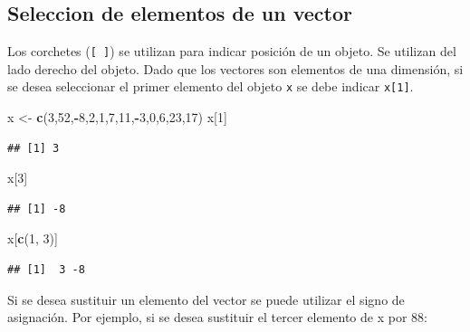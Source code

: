\documentclass[]{book}
\newenvironment{Shaded}{\begin{snugshade}}{\end{snugshade}}
\newcommand{\KeywordTok}[1]{\textcolor[rgb]{0.13,0.29,0.53}{\textbf{#1}}}
\newcommand{\DecValTok}[1]{\textcolor[rgb]{0.00,0.00,0.81}{#1}}
\newcommand{\StringTok}[1]{\textcolor[rgb]{0.31,0.60,0.02}{#1}}
\newcommand{\OperatorTok}[1]{\textcolor[rgb]{0.81,0.36,0.00}{\textbf{#1}}}
\newcommand{\NormalTok}[1]{#1}
\begin{document}
\hypertarget{seleccion-de-elementos-de-un-vector}{%
\subsection{Seleccion de elementos de un
vector}\label{seleccion-de-elementos-de-un-vector}}

Los corchetes (\texttt{{[}\ {]}}) se utilizan para indicar posición de
un objeto. Se utilizan del lado derecho del objeto. Dado que los
vectores son elementos de una dimensión, si se desea seleccionar el
primer elemento del objeto \texttt{x} se debe indicar \texttt{x{[}1{]}}.

\begin{Shaded}
\begin{Highlighting}[]
\NormalTok{x <-}\StringTok{ }\KeywordTok{c}\NormalTok{(}\DecValTok{3}\NormalTok{,}\DecValTok{52}\NormalTok{,}\OperatorTok{-}\DecValTok{8}\NormalTok{,}\DecValTok{2}\NormalTok{,}\DecValTok{1}\NormalTok{,}\DecValTok{7}\NormalTok{,}\DecValTok{11}\NormalTok{,}\OperatorTok{-}\DecValTok{3}\NormalTok{,}\DecValTok{0}\NormalTok{,}\DecValTok{6}\NormalTok{,}\DecValTok{23}\NormalTok{,}\DecValTok{17}\NormalTok{)}
\NormalTok{x[}\DecValTok{1}\NormalTok{]}
\end{Highlighting}
\end{Shaded}

\begin{verbatim}
## [1] 3
\end{verbatim}

\begin{Shaded}
\begin{Highlighting}[]
\NormalTok{x[}\DecValTok{3}\NormalTok{]}
\end{Highlighting}
\end{Shaded}

\begin{verbatim}
## [1] -8
\end{verbatim}

\begin{Shaded}
\begin{Highlighting}[]
\NormalTok{x[}\KeywordTok{c}\NormalTok{(}\DecValTok{1}\NormalTok{, }\DecValTok{3}\NormalTok{)]}
\end{Highlighting}
\end{Shaded}

\begin{verbatim}
## [1]  3 -8
\end{verbatim}

Si se desea sustituir un elemento del vector se puede utilizar el signo
de asignación. Por ejemplo, si se desea sustituir el tercer elemento de
x por 88:
\end{document}
